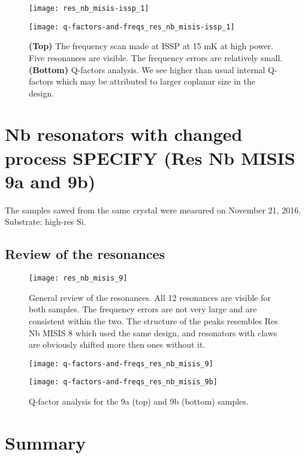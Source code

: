 \documentclass[12pt]{article}
\numberwithin{equation}{section}
\numberwithin{figure}{section}
\begin{document}
\begin{figure}[h!]
\centering
\texttt{[image: res\_nb\_misis-issp\_1]}

\vspace{0.5cm}
\texttt{[image: q-factors-and-freqs\_res\_nb\_misis-issp\_1]}

\caption{\textbf{(Top)} The frequency scan made at ISSP at 15 mK at high power. Five resonances are visible. The frequency errors are relatively small. \textbf{(Bottom)} Q-factors analysis. We see higher than usual internal Q-factors which may be attributed to larger coplanar size in the design.}
\label{fig:res_nb_misis_5_general}
\end{figure}

\section{Nb resonators with changed process SPECIFY (Res Nb MISIS 9a and 9b)}

The samples sawed from the same crystal were measured on November 21, 2016. Substrate: high-res Si.

\subsection{Review of the resonances}

\begin{figure}[h!]
\centering
\texttt{[image: res\_nb\_misis\_9]}

\caption{ General review of the resonances. All 12 resonances are visible for both samples. The frequency errors are not very large and are consistent within the two. The structure of the peaks resembles Res Nb MISIS 8 which used the same design, and resonators with claws are obviously shifted more then ones without it.}
\end{figure}

\begin{figure}[h!]
\centering
\texttt{[image: q-factors-and-freqs\_res\_nb\_misis\_9]}

\vspace{0.5cm}
\texttt{[image: q-factors-and-freqs\_res\_nb\_misis\_9b]}

\caption{Q-factor analysis for the 9a (top) and 9b (bottom) samples.}
\end{figure}


\newpage

\section{Summary}
\end{document}
